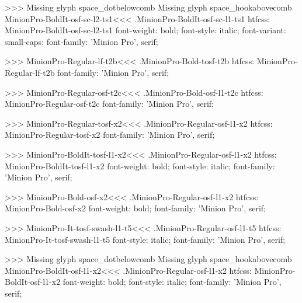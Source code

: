 {>>>
Missing glyph	space_dotbelowcomb
Missing glyph	space_hookabovecomb
\<MinionPro-BoldIt-osf-sc-l2-ts1\><<<
.MinionPro-BoldIt-osf-sc-l1-ts1
htfcss:  MinionPro-BoldIt-osf-sc-l2-ts1  font-weight: bold; font-style: italic; font-variant: small-caps; font-family: 'Minion Pro', serif;

>>>
\<MinionPro-Regular-lf-t2b\><<<
.MinionPro-Bold-tosf-t2b
htfcss:  MinionPro-Regular-lf-t2b  font-family: 'Minion Pro', serif;

>>>
\<MinionPro-Regular-osf-t2c\><<<
.MinionPro-Bold-osf-l1-t2c
htfcss:  MinionPro-Regular-osf-t2c  font-family: 'Minion Pro', serif;

>>>
\<MinionPro-Regular-tosf-x2\><<<
.MinionPro-Regular-osf-l1-x2
htfcss:  MinionPro-Regular-tosf-x2  font-family: 'Minion Pro', serif;

>>>
\<MinionPro-BoldIt-tosf-l1-x2\><<<
.MinionPro-Regular-osf-l1-x2
htfcss:  MinionPro-BoldIt-tosf-l1-x2  font-weight: bold; font-style: italic; font-family: 'Minion Pro', serif;

>>>
\<MinionPro-Bold-osf-x2\><<<
.MinionPro-Regular-osf-l1-x2
htfcss:  MinionPro-Bold-osf-x2  font-weight: bold; font-family: 'Minion Pro', serif;

>>>
\<MinionPro-It-tosf-swash-l1-t5\><<<
.MinionPro-Regular-osf-l1-t5
htfcss:  MinionPro-It-tosf-swash-l1-t5  font-style: italic; font-family: 'Minion Pro', serif;

>>>
Missing glyph	space_dotbelowcomb
Missing glyph	space_hookabovecomb
\<MinionPro-BoldIt-osf-l1-x2\><<<
.MinionPro-Regular-osf-l1-x2
htfcss:  MinionPro-BoldIt-osf-l1-x2  font-weight: bold; font-style: italic; font-family: 'Minion Pro', serif;

}
